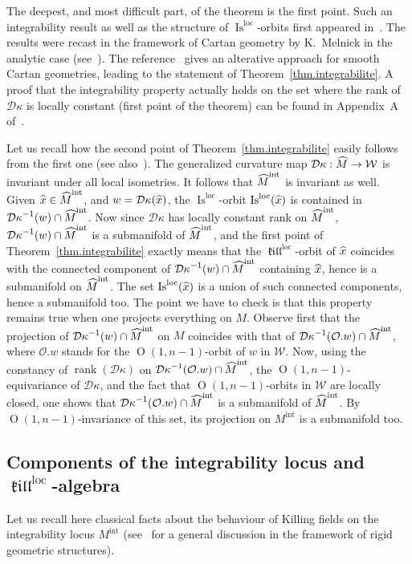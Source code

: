 \documentclass[11pt]{article}
\theoremstyle{definition}
\numberwithin{equation}{section}
\numberwithin{figure}{section}
\numberwithin{table}{section}
\DeclareMathOperator{\Omp}{O}%
\DeclareMathOperator{\Is}{Is}
\DeclareMathOperator{\rank}{rank}
\DeclareMathOperator{\loc}{loc}
\newcommand{\mint}{{M^{\intl}}}
\newcommand{\hmint}{{{\hat M}^{\intl}}}
\DeclareMathOperator{\intl}{int}
\DeclareMathOperator{\kil}{{\mathfrak{kill}}}
\newcommand{\kiloc}{\kil^{\loc}}
\newcommand{\calo}{\mathcal{O}}
\newcommand*\dk{{\mathcal{D}\kappa}}
\newcommand{\hm}{{\hat{M}}}
\newcommand{\hx}{{\hat{x}}}
\let\oldhat\hat
\renewcommand*\hat[1]{\mathchoice{\widehat{#1}}{\widehat{#1}}{\widehat{#1}}{\oldhat{#1}}}
\begin{document}
The deepest, and most difficult part, of the theorem is the first point. Such an integrability result as well as the structure of $\Is^{\loc}$-orbits first appeared in~\cite{gromov}. The results were recast in the framework of Cartan geometry by K.~Melnick in the analytic case (see~\cite{melnick}). The reference~\cite{vincent} gives an alterative approach for smooth Cartan geometries, leading to the statement of Theorem~\ref{thm.integrabilite}. A proof that the integrability property actually holds on the set where the rank of $\dk$ is locally constant (first point of the theorem) can be found in Appendix~A of~\cite{frances.open}.


Let us recall how the second point of Theorem~\ref{thm.integrabilite} easily follows from the first one (see also~\cite[Section~4.3.2]{vincent}). The generalized curvature map $\dk: \hm \to {\mathcal W}$ is invariant under all local isometries. It follows that $\hmint$ is invariant as well. Given $\hx \in \hmint$, and $w=\dk(\hx)$, the $\Is^{\loc}$-orbit $\Is^{\loc}(\hx)$ is contained in $\dk^{-1}(w) \cap \hmint$. Now since $\dk$ has locally constant rank on $\hmint$, $\dk^{-1}(w) \cap \hmint$ is a submanifold of $\hmint$, and the first point of Theorem~\ref{thm.integrabilite} exactly means that the $\kiloc$-orbit of $\hx$ coincides with the connected component of $\dk^{-1}(w) \cap \hmint$ containing $\hx$, hence is a submanifold on $\hmint$. The set $\Is^{\loc}(\hx)$ is a union of such connected components, hence a submanifold too. The point we have to check is that this property remains true when one projects everything on $M$. Observe first that the projection of $\dk^{-1}(w) \cap \hmint$ on $M$ coincides with that of $\dk^{-1}({\calo }.w) \cap \hmint$, where ${\calo}.w$ stands for the $\Omp(1,n-1)$-orbit of $w$ in ${\mathcal W}$. Now, using the constancy of $\rank(\dk)$ on $ \dk^{-1}({\calo }.w) \cap \hmint$, the $\Omp(1,n-1)$-equivariance of $\dk$, and the fact that $\Omp(1,n-1)$-orbits in ${\mathcal W}$ are locally closed, one shows that $\dk^{-1}({\calo }.w) \cap \hmint$ is a submanifold of $\hmint$. By $\Omp(1,n-1)$-invariance of this set, its projection on $\mint$ is a submanifold too.


\subsection{Components of the integrability locus and \texorpdfstring{$\kiloc$}{kiloc}-algebra}\label{sec.intlocus}
Let us recall here classical facts about the behaviour of Killing fields on the integrability locus $\mint$ (see~\cite[Section~5.15]{dambragro} for a general discussion in the framework of rigid geometric structures).
\end{document}
